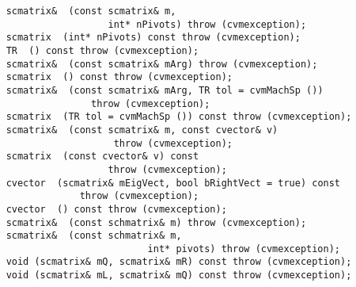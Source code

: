 \verb"    scmatrix& "\verb" (const scmatrix& m,"\\
\verb"                      int* nPivots) throw (cvmexception);"\\
\verb"    scmatrix "\verb" (int* nPivots) const throw (cvmexception);"\\
\verb"    TR "\verb" () const throw (cvmexception);"\\
\verb"    scmatrix& "\verb" (const scmatrix& mArg) throw (cvmexception);"\\
\verb"    scmatrix "\verb" () const throw (cvmexception);"\\
\verb"    scmatrix& "\verb" (const scmatrix& mArg, TR tol = cvmMachSp ())"\\
\verb"                   throw (cvmexception);"\\
\verb"    scmatrix "\verb" (TR tol = cvmMachSp ()) const throw (cvmexception);"\\
\verb"    scmatrix& "\verb" (const scmatrix& m, const cvector& v)"\\
\verb"                       throw (cvmexception);"\\
\verb"    scmatrix "\verb" (const cvector& v) const"\\
\verb"                      throw (cvmexception);"\\
\verb"    cvector "\verb" (scmatrix& mEigVect, bool bRightVect = true) const"\\
\verb"                 throw (cvmexception);"\\
\verb"    cvector "\verb" () const throw (cvmexception);"\\
\verb"    scmatrix& "\verb" (const schmatrix& m) throw (cvmexception);"\\
\verb"    scmatrix& "\verb" (const schmatrix& m,"\\
\verb"                             int* pivots) throw (cvmexception);"\\
\verb"    void "\verb"(scmatrix& mQ, scmatrix& mR) const throw (cvmexception);"\\
\verb"    void "\verb"(scmatrix& mL, scmatrix& mQ) const throw (cvmexception);"\\
